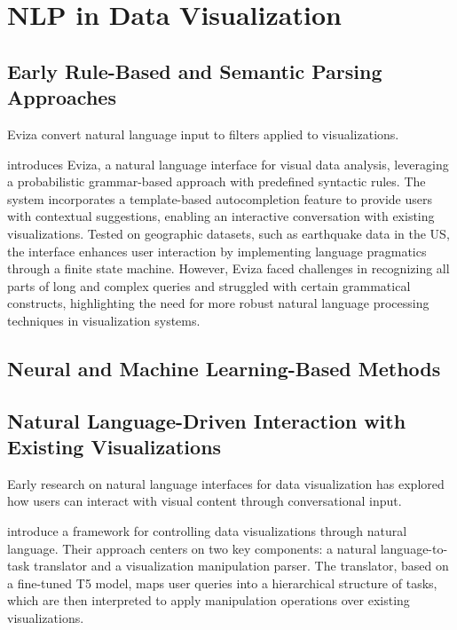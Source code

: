 \section{NLP in Data Visualization}

\subsection{Early Rule-Based and Semantic Parsing Approaches}

Eviza \cite{Setlur2016Eviza} convert natural language input to filters applied to visualizations. 

\cite{Setlur2016Eviza} introduces Eviza, a natural language interface for visual data analysis, leveraging a probabilistic grammar-based approach with predefined syntactic rules. The system incorporates a template-based autocompletion feature to provide users with contextual suggestions, enabling an interactive conversation with existing visualizations. Tested on geographic datasets, such as earthquake data in the US, the interface enhances user interaction by implementing language pragmatics through a finite state machine. However, Eviza faced challenges in recognizing all parts of long and complex queries and struggled with certain grammatical constructs, highlighting the need for more robust natural language processing techniques in visualization systems.

\cite{Narechania2021NL4DV}

\subsection{Neural and Machine Learning-Based Methods}

\cite{Luo2022NL2Vis}

\cite{Liu2021ADVISor}

\subsection{Natural Language-Driven Interaction with Existing Visualizations}

\cite{Wu2024LLMVis}

Early research on natural language interfaces for data visualization has explored how users can interact with visual content through conversational input.

\cite{Liu2024NLDriven} introduce a framework for controlling data visualizations through natural language. Their approach centers on two key components: a natural language-to-task translator and a visualization manipulation parser. The translator, based on a fine-tuned T5 model, maps user queries into a hierarchical structure of tasks, which are then interpreted to apply manipulation operations over existing visualizations.



